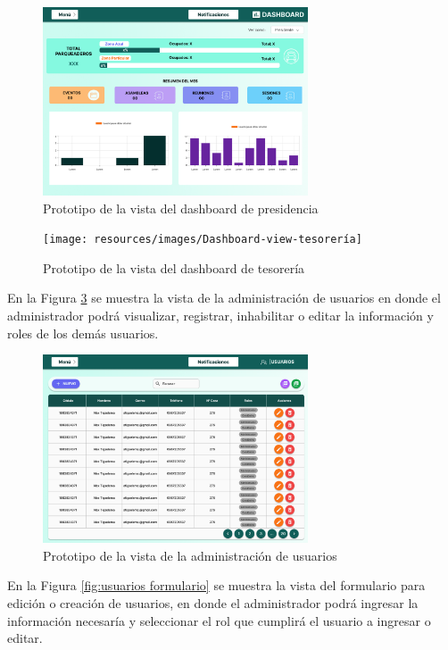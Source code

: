\begin{figure}[H]
    \centering
    \includegraphics[width=0.7\textwidth]{resources/images/Dashboard-view-presidente}
    \caption{Prototipo de la vista del dashboard de presidencia}
    \label{fig:dashboard-presidente}
\end{figure}

\begin{figure}[H]
    \centering
    \texttt{[image: resources/images/Dashboard-view-tesorería]}
    \caption{Prototipo de la vista del dashboard de tesorería}
    \label{fig:dashboard-tesorera}
\end{figure}

En la Figura \ref{fig:usuarios} se muestra la vista de la administración de usuarios en donde el administrador podrá visualizar, registrar, inhabilitar o editar la información y roles de los demás usuarios.

\begin{figure}[H]
    \centering
    \includegraphics[width=0.7\textwidth]{resources/images/usuarios}
    \caption{Prototipo de la vista de la administración de usuarios}
    \label{fig:usuarios}
\end{figure}

En la Figura \ref{fig:usuarios formulario} se muestra la vista del formulario para edición o creación de usuarios, en donde el administrador podrá ingresar la información necesaría y seleccionar el rol que cumplirá el usuario a ingresar o editar.

